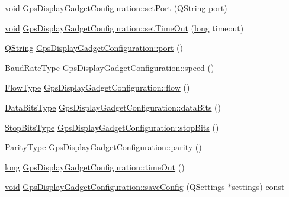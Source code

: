 \begin{DoxyCompactItemize}
\item 
\hyperlink{group___u_a_v_objects_plugin_ga444cf2ff3f0ecbe028adce838d373f5c}{void} \hyperlink{group___g_p_s_gadget_plugin_ga486451b6b46974085f14b206d4a69384}{Gps\-Display\-Gadget\-Configuration\-::set\-Port} (\hyperlink{group___u_a_v_objects_plugin_gab9d252f49c333c94a72f97ce3105a32d}{Q\-String} \hyperlink{classport}{port})
\item 
\hyperlink{group___u_a_v_objects_plugin_ga444cf2ff3f0ecbe028adce838d373f5c}{void} \hyperlink{group___g_p_s_gadget_plugin_ga1b7ab91eef34f393bf53bb8f216e40df}{Gps\-Display\-Gadget\-Configuration\-::set\-Time\-Out} (\hyperlink{ioapi_8h_a3c7b35ad9dab18b8310343c201f7b27e}{long} timeout)
\item 
\hyperlink{group___u_a_v_objects_plugin_gab9d252f49c333c94a72f97ce3105a32d}{Q\-String} \hyperlink{group___g_p_s_gadget_plugin_ga517cd55a15efad30e5b15a98de8c9767}{Gps\-Display\-Gadget\-Configuration\-::port} ()
\item 
\hyperlink{qextserialport_8h_a6f031169a6a9b150b5af707bb23cf010}{Baud\-Rate\-Type} \hyperlink{group___g_p_s_gadget_plugin_gae316339027f90f81c50cb8b1abffd2bd}{Gps\-Display\-Gadget\-Configuration\-::speed} ()
\item 
\hyperlink{qextserialport_8h_a02ad1c7cf791a069dd54e409f8db4790}{Flow\-Type} \hyperlink{group___g_p_s_gadget_plugin_ga971f5af6d2fe2353c15f6b88550339ec}{Gps\-Display\-Gadget\-Configuration\-::flow} ()
\item 
\hyperlink{qextserialport_8h_a189ef78c2c1b7537ab114d576f6214fa}{Data\-Bits\-Type} \hyperlink{group___g_p_s_gadget_plugin_gaee5d5b0ab0f7dced62f578c969dc3720}{Gps\-Display\-Gadget\-Configuration\-::data\-Bits} ()
\item 
\hyperlink{qextserialport_8h_adc8078895cd941d755d46633b54d3e7f}{Stop\-Bits\-Type} \hyperlink{group___g_p_s_gadget_plugin_ga972b1ba46194e9dd5b85289822953a02}{Gps\-Display\-Gadget\-Configuration\-::stop\-Bits} ()
\item 
\hyperlink{qextserialport_8h_aee22d32d87c815090354bf9b8e957ace}{Parity\-Type} \hyperlink{group___g_p_s_gadget_plugin_ga3a0d09e79d337c15dbc032ae237a8663}{Gps\-Display\-Gadget\-Configuration\-::parity} ()
\item 
\hyperlink{ioapi_8h_a3c7b35ad9dab18b8310343c201f7b27e}{long} \hyperlink{group___g_p_s_gadget_plugin_gae72a22f5fda6f350e9ca08c913bade96}{Gps\-Display\-Gadget\-Configuration\-::time\-Out} ()
\item 
\hyperlink{group___u_a_v_objects_plugin_ga444cf2ff3f0ecbe028adce838d373f5c}{void} \hyperlink{group___g_p_s_gadget_plugin_gadeca7dfdc8f1da65123d50b9bb29072c}{Gps\-Display\-Gadget\-Configuration\-::save\-Config} (Q\-Settings $\ast$settings) const 

\end{DoxyCompactItemize}
